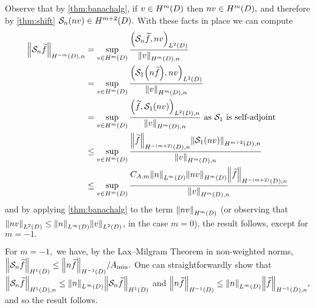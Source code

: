 Observe that by \cref{thm:banachalg}, if $v \in \HmD$ then $nv \in \HmD,$ and therefore by \cref{thm:shift} $\sdsol(nv) \in \HmptD.$ With these facts in place we can compute
\begin{align*}
\NHnfn{-m}{D}{\sdsol \ftilde} &= \sup_{v \in \HmD} \frac{\IPLtD{\sdsol \ftilde}{nv}}{\NHmDn{v}}\\
&= \sup_{v \in \HmD} \frac{\IPLtD{\sdsolo\mleft(n \ftilde\mright)}{nv}}{\NHmDn{v}}\\
&= \sup_{v \in \HmD} \frac{\IPLtDn{\ftilde}{\sdsolo\mleft(n v\mright)}}{\NHmDn{v}}\tas \sdsolo \text{ is self-adjoint}\\
&\leq \sup_{v \in \HmD} \frac{\NHnfn{-(m+2)}{D}{\ftilde}\NHnfn{m+2}{D}{\sdsolo\mleft(nv\mright)} }{\NHmDn{v}}\\
&\leq \sup_{v \in \HmD}  \frac{\CAfn{m} \NLiD{n} \NHmD{nv} \NHnfn{-(m+2)}{D}{\ftilde}}{\NHmDn{v}}
\end{align*}
and by applying \cref{thm:banachalg} to the term $\NHfn{m}{D}{nv}$ (or observing that $\NLtD{nv} \leq \NLiD{n}\NLtD{v}$, in the case $m=0$), the result follows, except for $m=-1.$

For $m=-1,$ we have, by the Lax--Milgram Theorem in non-weighted norms, $\NHoD{\Sn \ftilde} \leq \NHmoD{n\ftilde}/\Amin.$ One can straightforwardly show that $\NHnfn{1}{D}{\Sn \ftilde} \leq \NLiD{n} \NHoD{\Sn \ftilde}$ and $\NHmoD{n\ftilde} \leq \NLiD{n} \NHnfn{-1}{D}{\ftilde},$ and so the result follows.
\epf


